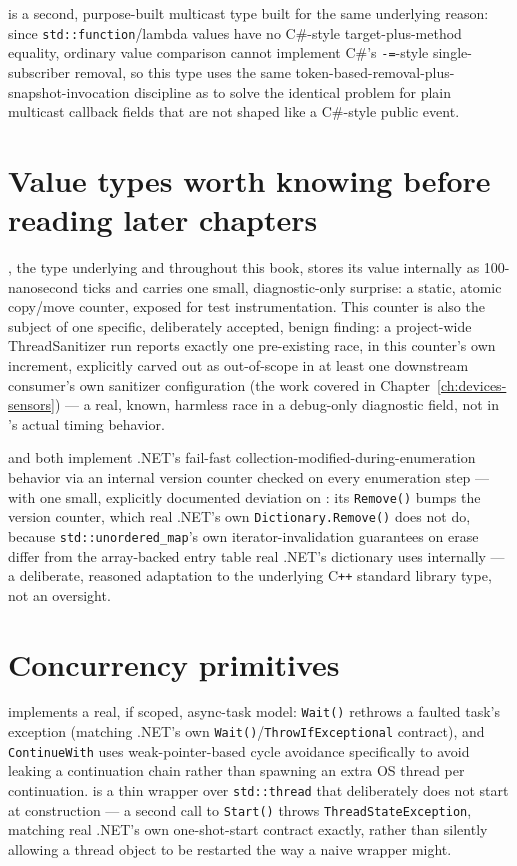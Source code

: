  is a second, purpose-built multicast type built
for the same underlying reason: since \texttt{std::function}/lambda values have no C\#-style
target-plus-method equality, ordinary value comparison cannot implement C\#'s
\texttt{-=}-style single-subscriber removal, so this type uses the same
token-based-removal-plus-snapshot-invocation discipline as  to solve
the identical problem for plain multicast callback fields that are not shaped like a
C\#-style public event.

\section{Value types worth knowing before reading later chapters}

, the type underlying  and
 throughout this book, stores its value internally
as 100-nanosecond ticks and carries one small, diagnostic-only surprise: a static, atomic
copy/move counter, exposed for test instrumentation. This counter is also the subject of one
specific, deliberately accepted, benign finding: a project-wide ThreadSanitizer run reports
exactly one pre-existing race, in this counter's own increment, explicitly carved out as
out-of-scope in at least one downstream consumer's own sanitizer configuration (the
 work covered in Chapter~\ref{ch:devices-sensors}) --- a real,
known, harmless race in a debug-only diagnostic field, not in 's actual
timing behavior.

 and  both
implement .NET's fail-fast collection-modified-during-enumeration behavior via an internal
version counter checked on every enumeration step --- with one small, explicitly documented
deviation on : its \texttt{Remove()} bumps the version counter, which
real .NET's own \texttt{Dictionary.Remove()} does not do, because \texttt{std::unordered\_map}'s
own iterator-invalidation guarantees on erase differ from the array-backed entry table real
.NET's dictionary uses internally --- a deliberate, reasoned adaptation to the underlying
C\texttt{++} standard library type, not an oversight.

\section{Concurrency primitives}

 implements a real, if scoped, async-task model:
\texttt{Wait()} rethrows a faulted task's exception (matching .NET's own
\texttt{Wait()}/\texttt{ThrowIfExceptional} contract), and \texttt{ContinueWith} uses
weak-pointer-based cycle avoidance specifically to avoid leaking a continuation chain rather
than spawning an extra OS thread per continuation.  is a thin
wrapper over \texttt{std::thread} that deliberately does not start at construction --- a
second call to \texttt{Start()} throws \texttt{ThreadStateException}, matching real .NET's own
one-shot-start contract exactly, rather than silently allowing a thread object to be
restarted the way a naive wrapper might.
